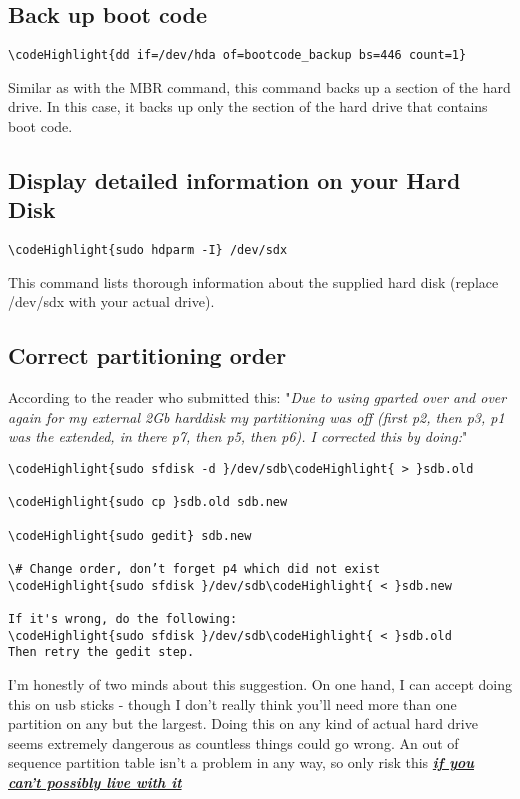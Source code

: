 \documentclass[12pt,a4paper]{article}
\begin{document}
\subsection{Back up boot code}
\begin{Verbatim}[commandchars=\\\{\}]
\codeHighlight{dd if=/dev/hda of=bootcode_backup bs=446 count=1}
\end{Verbatim}
Similar as with the MBR command, this command backs up a section of the hard drive.  In this case, it backs up only the section of the hard drive that contains boot code.

\subsection{Display detailed information on your Hard Disk}
\begin{Verbatim}[commandchars=\\\{\}]
\codeHighlight{sudo hdparm -I} /dev/sdx
\end{Verbatim}
This command lists thorough information about the supplied hard disk (replace /dev/sdx with your actual drive).

\subsection{Correct partitioning order}
According to the reader who submitted this:
"\textit{Due to using gparted over and over again for my external 2Gb harddisk my partitioning was off (first p2, then p3, p1 was the extended, in there p7, then p5, then p6).
I corrected this by doing:}"
\begin{Verbatim}[commandchars=\\\{\}]
\codeHighlight{sudo sfdisk -d }/dev/sdb\codeHighlight{ > }sdb.old

\codeHighlight{sudo cp }sdb.old sdb.new

\codeHighlight{sudo gedit} sdb.new 

\# Change order, don’t forget p4 which did not exist
\codeHighlight{sudo sfdisk }/dev/sdb\codeHighlight{ < }sdb.new

If it's wrong, do the following:
\codeHighlight{sudo sfdisk }/dev/sdb\codeHighlight{ < }sdb.old
Then retry the gedit step.
\end{Verbatim}
I'm honestly of two minds about this suggestion.  On one hand, I can accept doing this on usb sticks - though I don't really think you'll need more than one partition on any but the largest.  Doing this on any kind of actual hard drive seems extremely dangerous as countless things could go wrong.  An out of sequence partition table isn't a problem in any way, so only risk this \underline{\textbf{\textit{if you can't possibly live with it}}}
\end{document}
